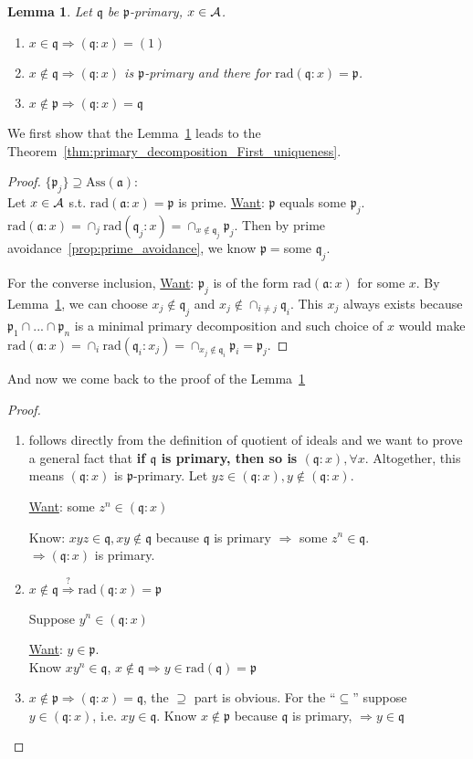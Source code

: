 \documentclass[11pt]{article}
\newtheorem{lemma}[thm]{Lemma}
\newcommand{\sca}{{\mathfrak a}}
\newcommand{\scp}{{\mathfrak p}}
\newcommand{\scq}{\mathfrak q}
\newcommand{\cala}{{\cal A}}
\newcommand{\Lrta}{\Longrightarrow}
\begin{document}
\begin{lemma}\label{lem:p-primary_ideal}
Let $\scq$ be $\scp$-primary, $x\in\cala$.
\begin{enumerate}[label=(\alph*)]
 \item
 $x\in\scq\Lrta(\scq:x)=(1)$
\item 
 $x\notin\scq\Lrta (\scq:x)$ is $\scp$-primary and there for $\text{rad}(\scq:x)=\scp$.
\item 
 $x\notin\scp\Lrta (\scq:x)=\scq$
\end{enumerate}
\end{lemma}

We first show that the Lemma~\ref{lem:p-primary_ideal} leads to the Theorem~\ref{thm:primary_decomposition_First_uniqueness}.
\begin{proof}
$\{\scp_j\}\supseteq \text{Ass}(  \sca)$:\\
 Let $x\in\cala$ s.t. $\text{rad}(\sca:x)=\scp$ is prime. \underline{Want}: $\scp$ equals some $\scp_j$. $\text{rad}(\sca:x)=\cap_j \text{rad}(\scq_j:x)=\cap_{x\notin\scq_j}\scp_j$. Then by prime avoidance~\ref{prop:prime_avoidance}, we know $\scp=$some $\scq_j$.

For the converse inclusion, \underline{Want}: $\scp_j$ is of the form $\text{rad}(\sca:x)$ for some $x$. By Lemma~\ref{lem:p-primary_ideal}, we can choose $x_j\notin \scq_j$ and $x_j\notin\cap_{i\neq j}\scq_i$. This $x_j$ always exists because $\scp_1\cap...\cap \scp_n$ is a minimal primary decomposition and such choice of $x$ would make $\text{rad}(\sca:x)=\cap_i \text{rad}(\scq_i:x_j)=\cap_{x_j\notin\scq_i}\scp_i=\scp_j$.
\end{proof}

And now we come back to the proof of the Lemma~\ref{lem:p-primary_ideal}
\begin{proof}\ 
\begin{enumerate}[label=(\alph*)]
\item follows directly from the definition of quotient of ideals and we want to prove a general fact that \textbf{ if $\scq$ is primary, then so is $(\scq:x),\forall x$}. Altogether, this means $(\scq:x)$ is $\scp$-primary.
Let $y z\in(\scq:x),y\notin (\scq:x)$. 

\underline{Want}: some $z^n\in(\scq:x)$

Know: $xyz\in\scq,xy\notin\scq$ because $\scq$ is primary $\Lrta$ some $z^n\in\scq$.\\
$\Lrta(\scq:x)$ is primary.
\item  
$x\notin\scq\overset{?}{\Lrta}\text{rad}(\scq:x)=\scp$

Suppose $y^n\in(\scq:x)$

\underline{Want}: $y\in\scp.$\\
Know $xy^n\in\scq$, $x\notin\scq\Lrta y\in \text{rad}(\scq)=\scp$
\item 
$x\notin \scp\Lrta (\scq:x)=\scq$, the $\supseteq$ part is obvious. For the ``$\subseteq$'' suppose $y\in(\scq:x)$, i.e. $xy\in\scq$. Know $x\notin\scp$ because $\scq$ is primary, $\Lrta y\in\scq$
\end{enumerate}
\end{proof}
\end{document}
